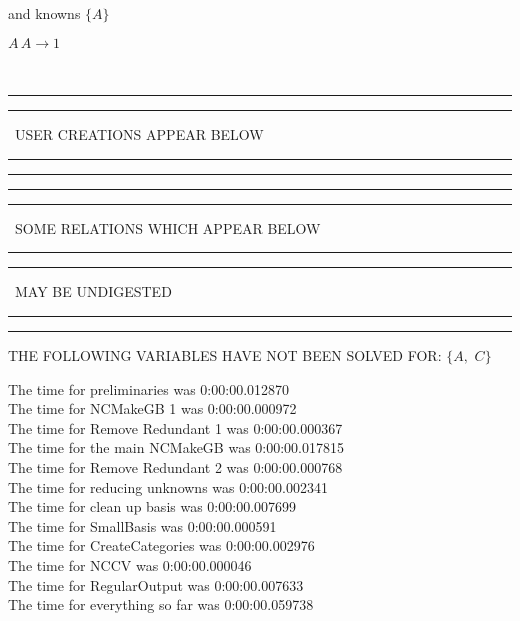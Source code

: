 \documentclass[rep10,leqno]{report}
\begin{document}
and knowns $\{A\}$\smallskip\\
\begin{minipage}{6in}
$
A\,
 A\rightarrow 1
$
\end{minipage}\\
\rule[2pt]{6in}{1pt}\hfil\break
\rule[2.5pt]{1.701in}{1pt}
\ USER CREATIONS APPEAR BELOW\ 
\rule[2.5pt]{1.701in}{1pt}\hfil\break
\rule[2pt]{6in}{1pt}\hfil\break
\rule[2pt]{6in}{4pt}\hfil\break
\rule[2pt]{1.45in}{4pt}
\ SOME RELATIONS WHICH APPEAR BELOW\ 
\rule[2pt]{1.45in}{4pt}\hfil\break
\rule[2pt]{2.18in}{4pt}
\ MAY BE UNDIGESTED\ 
\rule[2pt]{2.18in}{4pt}\hfil\break
\rule[2pt]{6in}{4pt}\hfil\break
THE FOLLOWING VARIABLES HAVE NOT BEEN SOLVED FOR:\hfil\break
$\{A,
$ $
C\}$
\smallskip\\
\vspace{10pt}

\noindent
The time for preliminaries was 0:00:00.012870\\
The time for NCMakeGB 1 was 0:00:00.000972\\
The time for Remove Redundant 1 was 0:00:00.000367\\
The time for the main NCMakeGB was 0:00:00.017815\\
The time for Remove Redundant 2 was 0:00:00.000768\\
The time for reducing unknowns was 0:00:00.002341\\
The time for clean up basis was 0:00:00.007699\\
The time for SmallBasis was 0:00:00.000591\\
The time for CreateCategories was 0:00:00.002976\\
The time for NCCV was 0:00:00.000046\\
The time for RegularOutput was 0:00:00.007633\\
The time for everything so far was 0:00:00.059738\\
\end{document}
